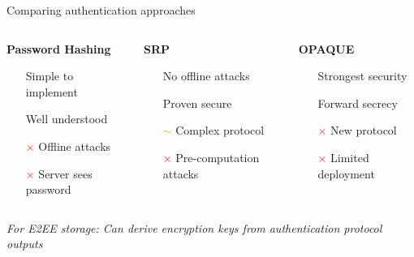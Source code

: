 \documentclass[aspectratio=169, lualatex, handout]{beamer}
\begin{document}
\begin{frame}{Comparing authentication approaches}
	\begin{columns}
		\begin{column}{0.33\textwidth}
			\textbf{Password Hashing}
			\vspace{0.3cm}
			\begin{itemize}
				\item[\textcolor{green}{\mycheckmark}] Simple to implement
				\item[\textcolor{green}{\mycheckmark}] Well understood
				\item[\textcolor{red}{$\times$}] Offline attacks
				\item[\textcolor{red}{$\times$}] Server sees password
			\end{itemize}
		\end{column}
		\begin{column}{0.33\textwidth}
			\textbf{SRP}
			\vspace{0.3cm}
			\begin{itemize}
				\item[\textcolor{green}{\mycheckmark}] No offline attacks
				\item[\textcolor{green}{\mycheckmark}] Proven secure
				\item[\textcolor{orange}{$\sim$}] Complex protocol
				\item[\textcolor{red}{$\times$}] Pre-computation attacks
			\end{itemize}
		\end{column}
		\begin{column}{0.34\textwidth}
			\textbf{OPAQUE}
			\vspace{0.3cm}
			\begin{itemize}
				\item[\textcolor{green}{\mycheckmark}] Strongest security
				\item[\textcolor{green}{\mycheckmark}] Forward secrecy
				\item[\textcolor{red}{$\times$}] New protocol
				\item[\textcolor{red}{$\times$}] Limited deployment
			\end{itemize}
		\end{column}
	\end{columns}
	\vspace{0.5cm}
	\begin{center}
		\textit{For E2EE storage: Can derive encryption keys from authentication protocol outputs}
	\end{center}
\end{frame}
\end{document}

